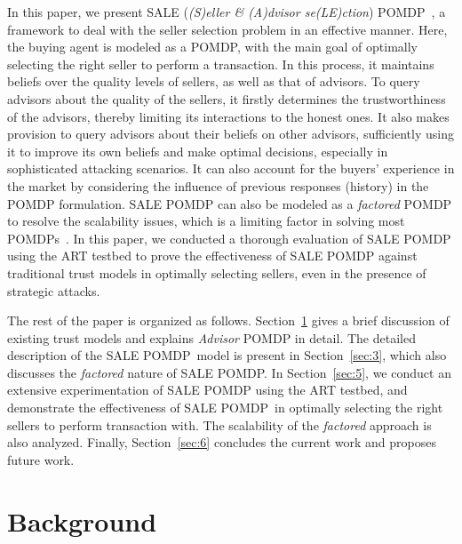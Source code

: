 \documentclass{aamas2014}
\providecommand{\SALEP}{SALE POMDP}
\begin{document}
In this paper, we present SALE (\emph{(S)eller \& (A)dvisor se(LE)ction}) POMDP~\cite{oliehoekreasoning}, a framework to deal with the seller selection problem in an effective manner. Here, the buying agent is modeled as a POMDP, with the main goal of optimally selecting the right seller to perform a transaction. In this process, it maintains beliefs over the quality levels of sellers, as well as that of advisors. To query advisors about the quality of the sellers, it firstly determines the trustworthiness of the advisors, thereby limiting its interactions to the honest ones. It also makes provision to query advisors about their beliefs on other advisors, sufficiently using it to improve its own beliefs and make optimal decisions, especially in sophisticated attacking scenarios. It can also account for the buyers' experience in the market by considering the influence of previous responses (history) in the POMDP formulation.  \SALEP{} can also be modeled as a \textit{factored} POMDP to resolve the scalability issues, which is a limiting factor in solving most POMDPs~\cite{poupart2005exploiting}. In this paper, we conducted a thorough evaluation of \SALEP{} using the ART testbed to prove the effectiveness of \SALEP{} against traditional trust models in optimally selecting sellers, even in the presence of strategic attacks.


The rest of the paper is organized as follows. Section~\ref{sec:2} gives a brief discussion of existing trust models and explains \textit{Advisor} POMDP in detail. The detailed description of the \SALEP\ model is present in Section~\ref{sec:3}, which also discusses the \textit{factored} nature of \SALEP{}. In Section~\ref{sec:5}, we conduct an extensive experimentation of \SALEP{} using the ART testbed, and demonstrate the effectiveness of \SALEP\ in optimally selecting the right sellers to perform transaction with. The scalability of the \textit{factored} approach is also analyzed. Finally, Section~\ref{sec:6} concludes the current work and proposes future work.

\section{Background}\label{sec:2}
\end{document}
